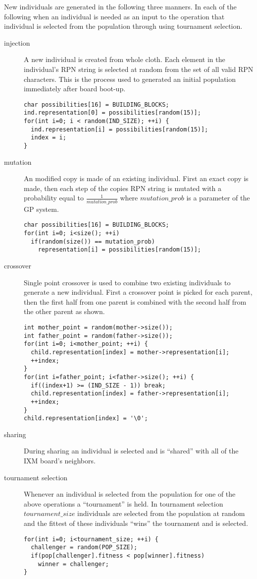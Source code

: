 \documentclass[11pt]{article}
\begin{document}
New individuals are generated in the following three manners.  In each
of the following when an individual is needed as an input to the
operation that individual is selected from the population through
using tournament selection.
\begin{description}
\item[injection] A new individual is created from whole cloth.  Each
     element in the individual's RPN string is selected at random from
     the set of all valid RPN characters.  This is the process used to
     generated an initial population immediately after board boot-up.
\lstset{language=c++}
\begin{lstlisting}
char possibilities[16] = BUILDING_BLOCKS;
ind.representation[0] = possibilities[random(15)];
for(int i=0; i < random(IND_SIZE); ++i) {
  ind.representation[i] = possibilities[random(15)];
  index = i;
}
\end{lstlisting}
\item[mutation] An modified copy is made of an existing individual.
     First an exact copy is made, then each step of the copies RPN
     string is mutated with a probability equal to
     $\frac{1}{mutation\_prob}$ where $mutation\_prob$ is a parameter
     of the GP system.
\lstset{language=c++}
\begin{lstlisting}
char possibilities[16] = BUILDING_BLOCKS;
for(int i=0; i<size(); ++i)
  if(random(size()) == mutation_prob)
    representation[i] = possibilities[random(15)];
\end{lstlisting}
\item[crossover] Single point crossover is used to combine two existing
     individuals to generate a new individual.  First a crossover
     point is picked for each parent, then the first half from one
     parent is combined with the second half from the other parent as
     shown.
\lstset{language=c++}
\begin{lstlisting}
int mother_point = random(mother->size());
int father_point = random(father->size());
for(int i=0; i<mother_point; ++i) {
  child.representation[index] = mother->representation[i];
  ++index;
}
for(int i=father_point; i<father->size(); ++i) {
  if((index+1) >= (IND_SIZE - 1)) break;
  child.representation[index] = father->representation[i];
  ++index;
}
child.representation[index] = '\0';
\end{lstlisting}
\item[sharing] During sharing an individual is selected and is ``shared''
     with all of the IXM board's neighbors.
\item[tournament selection] Whenever an individual is selected from the
     population for one of the above operations a ``tournament'' is
     held.  In tournament selection $tournament\_size$ individuals are
     selected from the population at random and the fittest of these
     individuals ``wins'' the tournament and is selected.
\lstset{language=c++}
\begin{lstlisting}
for(int i=0; i<tournament_size; ++i) {
  challenger = random(POP_SIZE);
  if(pop[challenger].fitness < pop[winner].fitness)
    winner = challenger;
}
\end{lstlisting}
\end{description}
\end{document}

